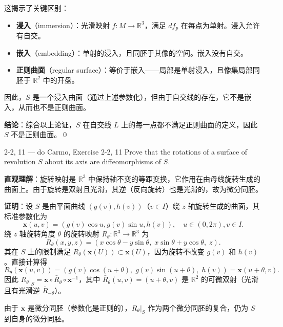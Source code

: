 \begin{solution}
这揭示了关键区别：
\begin{itemize}
\item \textbf{浸入}（immersion）：光滑映射 $f: M \to \mathbb{R}^3$，满足 $df_p$ 在每点为单射。浸入允许有自交。
\item \textbf{嵌入}（embedding）：单射的浸入，且同胚于其像的空间。嵌入没有自交。
\item \textbf{正则曲面}（regular surface）：等价于嵌入——局部是单射浸入，且像集局部同胚于 $\mathbb{R}^2$ 中的开盘。
\end{itemize}

因此，$S$ 是一个浸入曲面（通过上述参数化），但由于自交线的存在，它不是嵌入，从而也不是正则曲面。

\vspace{1ex}
\noindent\textbf{结论}：综合以上论证，$S$ 在自交线 $L$ 上的每一点都不满足正则曲面的定义，因此 $S$ 不是正则曲面。\qed
\end{solution}

\begin{exercise}{2-2, 11 — do Carmo, Exercise 2-2, 11}
Prove that the rotations of a surface of revolution $S$ about its axis are diffeomorphisms of $S$.
\end{exercise}

\begin{solution}
\textbf{直观理解}：旋转映射是 $\mathbb{R}^3$ 中保持轴不变的等距变换，它作用在由母线旋转生成的曲面上。由于旋转是双射且光滑，其逆（反向旋转）也是光滑的，故为微分同胚。

\textbf{证明}：设 $S$ 是由平面曲线 $(g(v), h(v))$（$v \in I$）绕 $z$ 轴旋转生成的曲面，其标准参数化为
\[
\mathbf{x}(u, v) = (g(v) \cos u, g(v) \sin u, h(v)), \quad u \in (0, 2\pi), v \in I.
\]
绕 $z$ 轴旋转角度 $\theta$ 的旋转映射 $R_\theta: \mathbb{R}^3 \to \mathbb{R}^3$ 为
\[
R_\theta(x, y, z) = (x \cos\theta - y \sin\theta,\; x \sin\theta + y \cos\theta,\; z).
\]
其在 $S$ 上的限制满足 $R_\theta(\mathbf{x}(U)) \subset \mathbf{x}(U)$，因为旋转不改变 $g(v)$ 和 $h(v)$。直接计算得
\[
R_\theta(\mathbf{x}(u, v)) = (g(v)\cos(u+\theta),\; g(v)\sin(u+\theta),\; h(v)) = \mathbf{x}(u+\theta, v).
\]
因此 $R_\theta|_S = \mathbf{x} \circ \bar{R}_\theta \circ \mathbf{x}^{-1}$，其中 $\bar{R}_\theta(u, v) = (u+\theta, v)$ 是 $\mathbb{R}^2$ 的可微双射（光滑且有光滑逆 $\bar{R}_{-\theta}$）。

由于 $\mathbf{x}$ 是微分同胚（参数化是正则的），$R_\theta|_S$ 作为两个微分同胚的复合，仍为 $S$ 到自身的微分同胚。
\end{solution}


